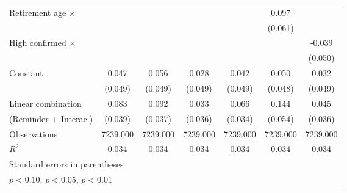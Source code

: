 {\begin{tabular}{l*{6}{c}}
\addlinespace
Retirement age $\times$&                     &                     &                     &                     &       0.097         &                     \\
                    &                     &                     &                     &                     &     (0.061)         &                     \\
\addlinespace
High confirmed $\times$&                     &                     &                     &                     &                     &      -0.039         \\
                    &                     &                     &                     &                     &                     &     (0.050)         \\
\addlinespace
Constant            &       0.047         &       0.056         &       0.028         &       0.042         &       0.050         &       0.032         \\
                    &     (0.049)         &     (0.049)         &     (0.049)         &     (0.049)         &     (0.048)         &     (0.049)         \\
\midrule
Linear combination  &       0.083         &       0.092         &       0.033         &       0.066         &       0.144         &       0.045         \\
(Reminder + Interac.)&     (0.039)         &     (0.037)         &     (0.036)         &     (0.034)         &     (0.054)         &     (0.036)         \\
Observations        &    7239.000         &    7239.000         &    7239.000         &    7239.000         &    7239.000         &    7239.000         \\
\(R^{2}\)           &       0.034         &       0.034         &       0.034         &       0.034         &       0.034         &       0.034         \\
\bottomrule
\multicolumn{7}{l}{\footnotesize Standard errors in parentheses}\\
\multicolumn{7}{l}{\footnotesize \sym{*} \(p<0.10\), \sym{**} \(p<0.05\), \sym{***} \(p<0.01\)}\\
\end{tabular}
}
